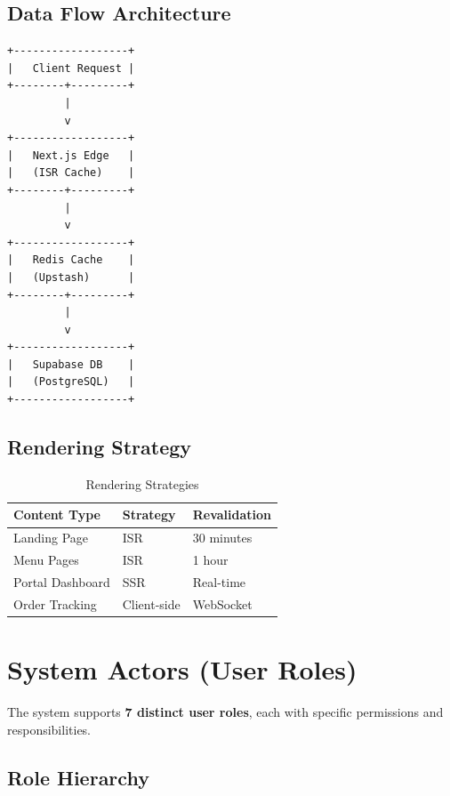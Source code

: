 \documentclass[12pt,a4paper]{article}
\begin{document}
\subsection{Data Flow Architecture}

\begin{verbatim}
+------------------+
|   Client Request |
+--------+---------+
         |
         v
+------------------+
|   Next.js Edge   |
|   (ISR Cache)    |
+--------+---------+
         |
         v
+------------------+
|   Redis Cache    |
|   (Upstash)      |
+--------+---------+
         |
         v
+------------------+
|   Supabase DB    |
|   (PostgreSQL)   |
+------------------+
\end{verbatim}

\subsection{Rendering Strategy}

\begin{table}[h]
\centering
\begin{tabular}{@{}lll@{}}
\toprule
\textbf{Content Type} & \textbf{Strategy} & \textbf{Revalidation} \\
\midrule
Landing Page & ISR & 30 minutes \\
Menu Pages & ISR & 1 hour \\
Portal Dashboard & SSR & Real-time \\
Order Tracking & Client-side & WebSocket \\
\bottomrule
\end{tabular}
\caption{Rendering Strategies}
\end{table}

\section{System Actors (User Roles)}

The system supports \textbf{7 distinct user roles}, each with specific permissions and responsibilities.

\subsection{Role Hierarchy}
\end{document}
